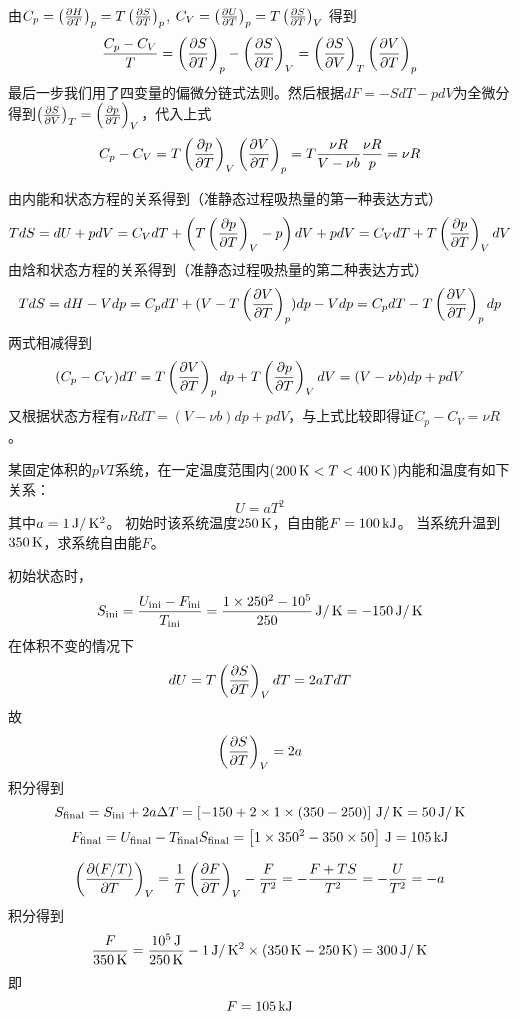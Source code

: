 \documentclass[CJK]{beamer}
\begin{document}
\begin{frame}
  \bch
由$C_p  =\pfrac HTp = T \pfrac STp$, $C_V = \pfrac UTp = T\pfrac STV$
得到
$$\frac{C_p - C_V}{T} = \pfrac STp - \pfrac STV = \pfrac SVT  \pfrac VTp $$
最后一步我们用了四变量的偏微分链式法则。然后根据$dF = - SdT - pdV$为全微分得到$\pfrac SVT = \pfrac pTV$，代入上式
$$ C_p - C_V = T\pfrac pTV \pfrac VTp = T \frac{\nu R}{V-\nu b} \frac{\nu R}{p} = \nu R$$

  \ech
\end{frame}


\begin{frame}
  \bch
由内能和状态方程的关系得到（准静态过程吸热量的第一种表达方式）
{\scriptsize 
$$ T dS  = dU + pdV = C_V dT + \left(T\pfrac pTV -p\right)dV+pdV = C_V dT + T\pfrac pTV dV  $$}
由焓和状态方程的关系得到（准静态过程吸热量的第二种表达方式）
{\scriptsize 
$$ TdS = dH - Vdp = C_p dT + (V-T\pfrac VTp)dp - Vdp = C_p dT - T\pfrac VTp dp$$}
两式相减得到
$$ (C_p- C_V)dT =  T\pfrac VTp dp + T\pfrac pTV dV = (V-\nu b)dp + p dV $$
又根据状态方程有$ \nu R dT = (V-\nu b) dp + p dV$，与上式比较即得证$C_p - C_V = \nu R$。
  \ech
\end{frame}


\begin{frame}
  \bch
某固定体积的$pVT$系统，在一定温度范围内($200\SIK < T< 400 \SIK$)内能和温度有如下关系：
  $$U =  aT^2 $$
  其中$a=1 \SIJ/\SIK^2$。
  初始时该系统温度$250\SIK$，自由能$F = 100 \SIkJ$。
  当系统升温到$350\SIK$，求系统自由能$F$。
  \ech
\end{frame}

\begin{frame}
  \bch
  初始状态时，
  $$ S_{\rm ini} = \frac{U_{\rm ini}-F_{\rm ini}}{T_{\rm ini}} = \frac{1\times 250^2 - 10^5}{250} \SIJ/\SIK = -150\SIJ/\SIK$$
  在体积不变的情况下
  $$ dU = T\pfrac STV dT  =  2aTdT$$
  故
  $$ \pfrac STV = 2a $$
  积分得到
  $$ S_{\rm final}  = S_{\rm ini} + 2a\Delta T =  \left[-150 + 2\times 1\times (350-250) \right] \SIJ/\SIK = 50 \SIJ/\SIK $$
  $$ F_{\rm final} = U_{\rm final}-T_{\rm final}S_{\rm final} = \left[1\times 350^2 - 350\times 50\right] \SIJ = 105\SIkJ$$
  
  \ech
\end{frame}

\begin{frame}
  \bch
  $$\pfrac {(F/T)}TV = \frac{1}{T}\pfrac FTV - \frac{F}{T^2} = -\frac{F+TS}{T^2} = -\frac{U}{T^2} = -a $$
  积分得到
  $$\frac{F}{350\SIK} = \frac{10^5\SIJ}{250\SIK} - 1\SIJ/\SIK^2\times(350\SIK - 250\SIK) = 300 \SIJ/\SIK$$
  即
  $$F = 105 \SIkJ$$

  \ech
\end{frame}
\end{document}

